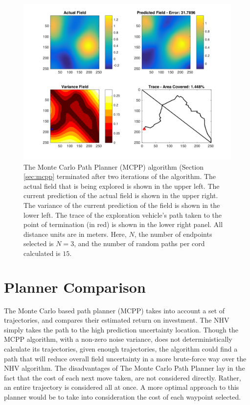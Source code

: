 
\begin{figure}[htb!]
	\centering
	\includegraphics[width=0.95\linewidth]{figures/mc_4panel.png}
	\captionsetup{skip=0.20\baselineskip}
	\ssp
	\caption{The Monte Carlo Path Planner (MCPP) algorithm (Section \ref{sec:mcpp} terminated after two iterations of the algorithm. The actual field that is being explored is shown in the upper left. The current prediction of the actual field is shown in the upper right. The variance of the current prediction of the field is shown in the lower left. The trace of the exploration vehicle's path taken to the point of termination (in red) is shown in the lower right panel. All distance units are in meters. Here, $N$, the number of endpoints selected is $N=3$, and the number of random paths per cord calculated is $15$.}
	\label{fig:mcpp}
\end{figure}

\section{Planner Comparison}
The Monte Carlo based path planner (MCPP) takes into account a set of trajectories, and compares their estimated return on investment. The NHV simply takes the path to the high prediction uncertainty location. Though the MCPP algorithm, with a non-zero noise variance, does not deterministically calculate its trajectories, given enough trajectories, the algorithm could find a path that will reduce overall field uncertainty in a more brute-force way over the NHV algorithm. The disadvantages of The Monte Carlo Path Planner lay in the fact that the cost of each next move taken, are not considered directly. Rather, an entire trajectory is considered all at once. A more optimal approach to this planner would be to take into consideration the cost of each waypoint selected.
